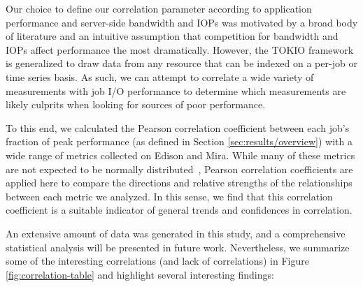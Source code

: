 Our choice to define our correlation parameter according to application performance and server-side bandwidth and IOPs was motivated by a broad body of literature and an intuitive assumption that competition for bandwidth and IOPs affect performance the most dramatically.
However, the TOKIO framework is generalized to draw data from any resource that can be indexed on a per-job or time series basis.
As such, we can attempt to correlate a wide variety of measurements with job I/O performance to determine which measurements are likely culprits when looking for sources of poor performance.

To this end, we calculated the Pearson correlation coefficient between each job's fraction of peak performance (as defined in Section \ref{sec:results/overview}) with a wide range of metrics collected on Edison and Mira.
While many of these metrics are not expected to be normally distributed~\cite{Kim2010}, Pearson correlation coefficients are applied here to compare the directions and relative strengths of the relationships between each metric we analyzed.
In this sense, we find that this correlation coefficient is a suitable indicator of general trends and confidences in correlation.

An extensive amount of data was generated in this study, and a comprehensive statistical analysis will be presented in future work.
Nevertheless, we summarize some of the interesting correlations (and lack of correlations) in Figure \ref{fig:correlation-table} and highlight several interesting findings:

